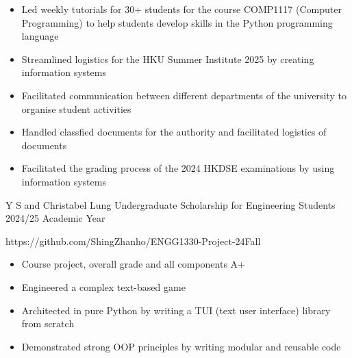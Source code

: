 \documentclass[10pt,a4paper,withhypeper,normalphoto]{altacv}
\begin{document}
\begin{paracol}{2}


\begin{itemize}
  \item Led weekly tutorials for 30+ students for the course COMP1117 (Computer Programming) to help students develop skills in the Python programming language
\end{itemize}

\divider

\begin{itemize}
\item Streamlined logistics for the HKU Summer Institute 2025 by creating information systems
\item Facilitated communication between different departments of the university to organise student activities
\end{itemize}

\divider


\begin{itemize}
\item Handled classfied documents for the authority and facilitated logistics of documents
\item Facilitated the grading process of the 2024 HKDSE examinations by using information systems
\end{itemize}


\cvachievement
  {\faTrophy}
  {Y S and Christabel Lung Undergraduate Scholarship for Engineering Students}
  {2024/25 Academic Year}



{
https://github.com/ShingZhanho/ENGG1330-Project-24Fall
\begin{itemize}
  \item Course project, overall grade and all components A+
  \item Engineered a complex text-based game
  \item Architected in pure Python by writing a TUI (text user interface) library from scratch
  \item Demonstrated strong OOP principles by writing modular and reusable code
\end{itemize}
}


\end{paracol}
\end{document}
